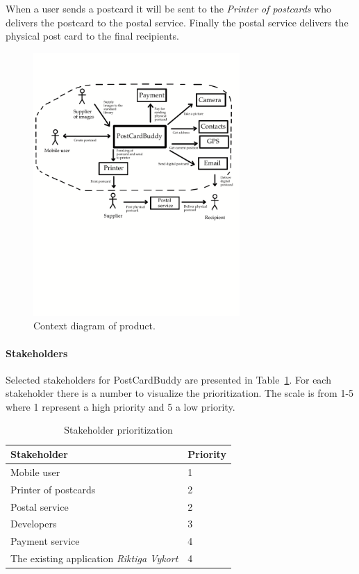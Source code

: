 \documentclass[10pt,a4paper]{article}
\begin{document}
When a user sends a postcard it will be sent to the  \textit{Printer of postcards} who delivers the postcard to the postal service. Finally the postal service delivers the physical post card to the final recipients. 

\begin{figure}[h!]
\centering
\includegraphics[width=0.7\textwidth]{ContextDiagram3.pdf}
\caption{Context diagram of product.}
\label{fig:context}
\end{figure}
\FloatBarrier

\paragraph{Stakeholders}
Selected stakeholders for PostCardBuddy are presented in Table~\ref{table:stakeholder}. For each stakeholder there is a number to visualize the prioritization. The scale is from 1-5 where 1 represent a high priority and 5 a low priority.


\begin{table}[h!]
\centering
\label{table:deliv}
\begin{tabular}{|l|l|} \hline
\textbf{Stakeholder} & \textbf{Priority} \\
\hline
Mobile user & 1\\
\hline
Printer of postcards & 2\\
\hline
Postal service & 2\\
\hline
Developers & 3\\
\hline
Payment service & 4\\
\hline
The existing application \textit{Riktiga Vykort} & 4\\
\hline

\end{tabular}\\
\caption{Stakeholder prioritization}
\label{table:stakeholder}
\end{table}
\end{document}
